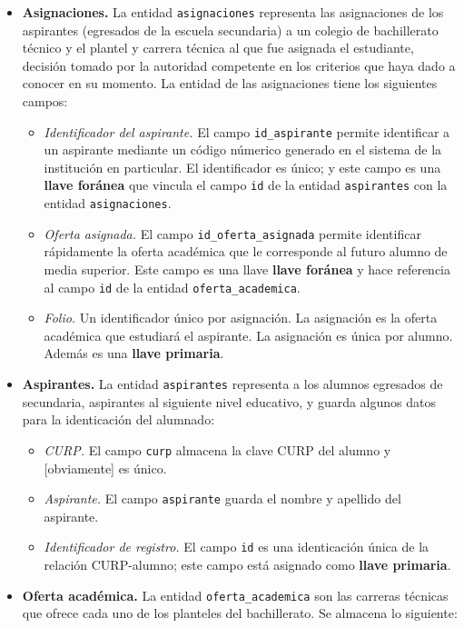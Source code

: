 \documentclass[12pt]{article}
\begin{document}
\begin{itemize}
	\item \textbf{Asignaciones.} La entidad \texttt{asignaciones} representa las asignaciones de los aspirantes (egresados de la escuela secundaria) a un colegio de bachillerato técnico y el plantel y carrera técnica al que fue asignada el estudiante, decisión tomado por la autoridad competente en los criterios que haya dado a conocer en su momento. La entidad de las asignaciones tiene los siguientes campos:
		\begin{itemize}
			\item \textit{Identificador del aspirante.} El campo \texttt{id\_aspirante} permite identificar a un aspirante mediante un código númerico generado en el sistema de la institución en particular. El identificador es único; y este campo es una \textbf{llave foránea} que vincula el campo \texttt{id} de la entidad \texttt{aspirantes} con la entidad \texttt{asignaciones}.
			\item \textit{Oferta asignada.} El campo \texttt{id\_oferta\_asignada} permite identificar rápidamente la oferta académica que le corresponde al futuro alumno de media superior. Este campo es una llave \textbf{llave foránea} y hace referencia al campo \texttt{id} de la entidad \texttt{oferta\_academica}.
			\item \textit{Folio.} Un identificador único por asignación. La asignación es la oferta académica que estudiará el aspirante. La asignación es única por alumno. Además es una \textbf{llave primaria}.
		\end{itemize}
	\item \textbf{Aspirantes.} La entidad \texttt{aspirantes} representa a los alumnos egresados de secundaria, aspirantes al siguiente nivel educativo, y guarda algunos datos para la identicación del alumnado:
		\begin{itemize}
			\item \textit{CURP.} El campo \texttt{curp} almacena la clave CURP del alumno y [obviamente] es único. 
			\item \textit{Aspirante.} El campo \texttt{aspirante} guarda el nombre y apellido del aspirante. 
			\item \textit{Identificador de registro.} El campo \texttt{id} es una identicación única de la relación CURP-alumno; este campo está asignado como \textbf{llave primaria}.
		\end{itemize}
	\item \textbf{Oferta académica.} La entidad \texttt{oferta\_academica} son las carreras técnicas que ofrece cada uno de los planteles del bachillerato. Se almacena lo siguiente:

\end{itemize}
\end{document}
